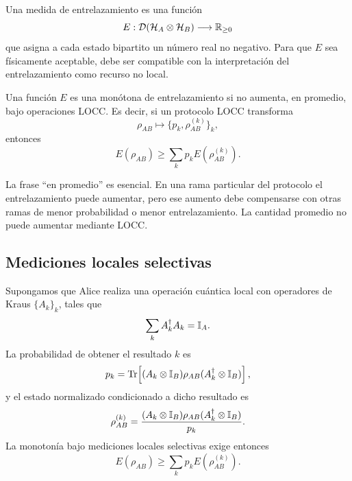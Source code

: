 \documentclass[../main.tex]{subfiles}
\begin{document}
Una medida de entrelazamiento es una función
\begin{equation*}
    E:\mathcal D(\mathcal{H}_A\otimes\mathcal{H}_B)\longrightarrow \mathbb{R}_{\geq0}
\end{equation*}
que asigna a cada estado bipartito un número real no negativo. Para que \(E\) sea físicamente aceptable, debe ser compatible con la interpretación del entrelazamiento como recurso no local.

\begin{definicion}
Una función \(E\) es una monótona de entrelazamiento si no aumenta, en promedio, bajo operaciones LOCC. Es decir, si un protocolo LOCC transforma
\begin{equation*}
    \rho_{AB}\longmapsto \{p_k,\rho_{AB}^{(k)}\}_k,
\end{equation*}
entonces
\begin{equation}
    E(\rho_{AB})\geq \sum_k p_k E\!\left(\rho_{AB}^{(k)}\right).
    \label{eq:monotonia-promedio}
\end{equation}
\end{definicion}

La frase ``en promedio'' es esencial. En una rama particular del protocolo el entrelazamiento puede aumentar, pero ese aumento debe compensarse con otras ramas de menor probabilidad o menor entrelazamiento. La cantidad promedio no puede aumentar mediante LOCC.

\subsection{Mediciones locales selectivas}

Supongamos que Alice realiza una operación cuántica local con operadores de Kraus \(\{A_k\}_k\), tales que
\begin{equation*}
    \sum_k A_k^\dagger A_k=\mathbb{I}_A.
\end{equation*}
La probabilidad de obtener el resultado \(k\) es
\begin{equation}
    p_k=\operatorname{Tr}\!\left[(A_k\otimes\mathbb{I}_B)\rho_{AB}(A_k^\dagger\otimes\mathbb{I}_B)\right],
    \label{eq:probabilidad-kraus-local}
\end{equation}
y el estado normalizado condicionado a dicho resultado es
\begin{equation}
    \rho_{AB}^{(k)}=\frac{(A_k\otimes\mathbb{I}_B)\rho_{AB}(A_k^\dagger\otimes\mathbb{I}_B)}{p_k}.
    \label{eq:estado-condicionado-kraus-local}
\end{equation}
La monotonía bajo mediciones locales selectivas exige entonces
\begin{equation}
    E(\rho_{AB})\geq \sum_k p_k E\!\left(\rho_{AB}^{(k)}\right).
    \label{eq:monotonia-medicion-local}
\end{equation}
\end{document}
